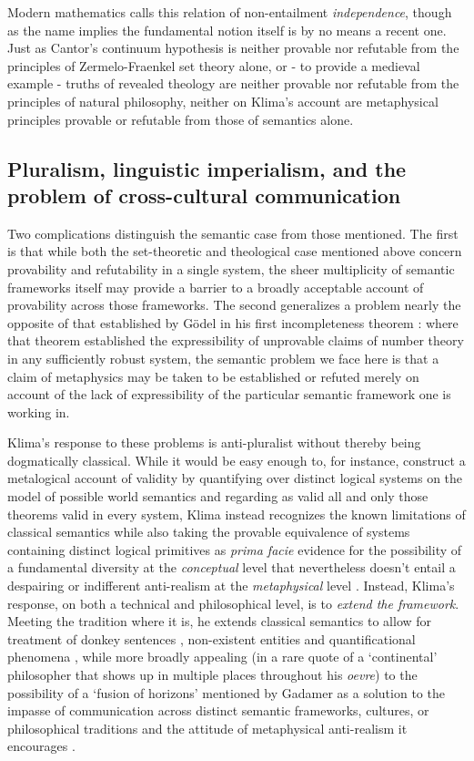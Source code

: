 \documentclass[]{article}
\begin{document}
Modern mathematics calls this relation of non-entailment \emph{independence}, 
though as the name implies the fundamental notion itself is by no means a recent one. 
Just as Cantor's continuum hypothesis is neither provable nor refutable from the principles of Zermelo-Fraenkel set theory alone, 
or - to provide a medieval example - 
truths of revealed theology are neither provable nor refutable from the principles of natural philosophy, 
neither on Klima's account are metaphysical principles provable or refutable from those of semantics alone. 

\subsection{Pluralism, linguistic imperialism, and the problem of cross-cultural communication}
Two complications distinguish the semantic case from those mentioned. 
The first is that while both the set-theoretic and theological case mentioned above concern provability and refutability in a single system, 
the sheer multiplicity of semantic frameworks itself may provide a barrier to a broadly acceptable account of provability across those frameworks. 
The second generalizes a problem nearly the opposite of that established by G\"{o}del in his first incompleteness theorem \autocite{Godel1931}:
where that theorem established the expressibility of unprovable claims of number theory in any sufficiently robust system, 
the semantic problem we face here is that a claim of metaphysics may be taken to be established or refuted merely on account of the lack of expressibility of the particular semantic framework one is working in. 

Klima's response to these problems is anti-pluralist 
without thereby being dogmatically classical. 
While it would be easy enough to, for instance, 
construct a metalogical account of validity by quantifying over distinct logical systems on the model of possible world semantics and regarding as valid all and only those theorems valid in every system, 
Klima instead recognizes the known limitations of classical semantics 
while also taking the provable equivalence of systems containing distinct logical primitives
as \emph{prima facie} evidence for the possibility of a fundamental diversity at the \emph{conceptual} level 
that nevertheless doesn't entail a despairing or indifferent anti-realism at the \emph{metaphysical} level \autocite{Klima2012}.
Instead, 
Klima's response, 
on both a technical and philosophical level, 
is to \emph{extend the framework}. 
Meeting the tradition where it is, he extends classical semantics to allow for treatment of 
donkey sentences \autocite{Klima1988,Klima2010}, 
non-existent entities \autocite{Klima2001}
and quantificational phenomena \autocite{KlimaSandu1990},
while more broadly appealing (in a rare quote of a `continental' philosopher that shows up in multiple places throughout his \emph{oevre}) 
to the possibility of a `fusion of horizons' mentioned by Gadamer 
as a solution to the impasse of communication across distinct semantic frameworks, cultures, or philosophical traditions 
and the attitude of metaphysical anti-realism it encourages \autocite{Klima2000,Klima2009a}.
\end{document}
